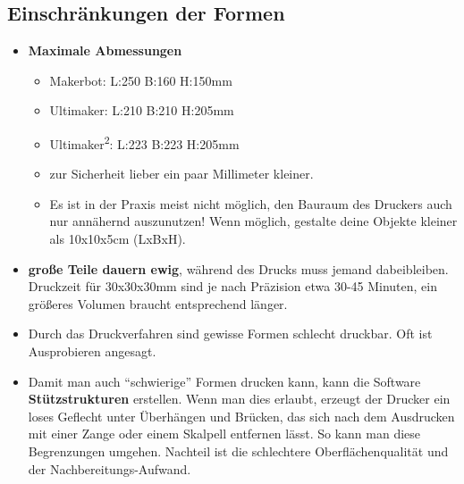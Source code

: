 \documentclass{\basedir/fablab-document}
\newcommand{\ts}[1]{\textsuperscript{#1}}
\begin{document}
\subsection{Einschränkungen der Formen}
\begin{itemize}
\item \textbf{Maximale Abmessungen}
\begin{itemize}
 \item Makerbot: L:250 B:160 H:150mm
 \item Ultimaker: L:210 B:210 H:205mm
 \item Ultimaker\ts2: L:223 B:223 H:205mm
 \item zur Sicherheit lieber ein paar Millimeter kleiner.
 \item Es ist in der Praxis meist nicht möglich, den Bauraum des Druckers auch nur annähernd auszunutzen! Wenn möglich, gestalte deine Objekte kleiner als 10x10x5cm (LxBxH).
\end{itemize}
\item \textbf{große Teile dauern ewig}, während des Drucks muss jemand dabeibleiben. Druckzeit für 30x30x30mm sind je
nach Präzision etwa 30-45 Minuten, ein größeres Volumen braucht entsprechend länger.
\item Durch das Druckverfahren sind gewisse Formen schlecht druckbar. Oft ist Ausprobieren angesagt.
\item Damit man auch \enquote{schwierige} Formen drucken kann, kann die Software \textbf{Stützstrukturen} erstellen. Wenn man dies erlaubt,
erzeugt der Drucker ein loses Geflecht unter Überhängen und Brücken,
das sich nach dem Ausdrucken mit einer Zange oder einem Skalpell entfernen lässt. So kann
man diese Begrenzungen umgehen. Nachteil ist die schlechtere
Oberflächenqualität und der Nachbereitungs-Aufwand.
\end{itemize}
\end{document}
